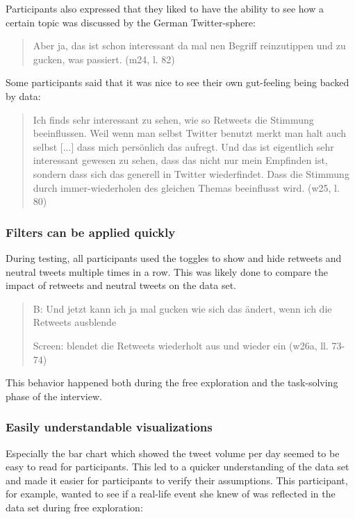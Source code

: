 Participants also expressed that they liked to have the ability to see how a certain topic was discussed by the German Twitter-sphere:

\begin{quote}
    Aber ja, das ist schon interessant da mal nen Begriff reinzutippen und zu gucken, was passiert. (m24, l. 82)
\end{quote}

Some participants said that it was nice to see their own gut-feeling being backed by data:

\begin{quote}
    Ich finds sehr interessant zu sehen, wie so Retweets die Stimmung beeinflussen. Weil wenn man selbst Twitter benutzt merkt man halt auch selbst [...] dass mich persönlich das aufregt. Und das ist eigentlich sehr interessant gewesen zu sehen, dass das nicht nur mein Empfinden ist, sondern dass sich das generell in Twitter wiederfindet. Dass die Stimmung durch immer-wiederholen des gleichen Themas beeinflusst wird. (w25, l. 80)
\end{quote}

\subsubsection*{Filters can be applied quickly}
During testing, all participants used the toggles to show and hide retweets and neutral tweets multiple times in a row. This was likely done to compare the impact of retweets and neutral tweets on the data set.

\begin{quote}
    B: Und jetzt kann ich ja mal gucken wie sich das ändert, wenn ich die Retweets ausblende

    Screen: blendet die Retweets wiederholt aus und wieder ein (w26a, ll. 73-74)
\end{quote}

This behavior happened both during the free exploration and the task-solving phase of the interview.

\subsubsection*{Easily understandable visualizations}
Especially the bar chart which showed the tweet volume per day seemed to be easy to read for participants. This led to a quicker understanding of the data set and made it easier for participants to verify their assumptions. This participant, for example, wanted to see if a real-life event she knew of was reflected in the data set during free exploration:

